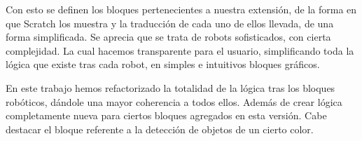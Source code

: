 Con esto se definen los bloques pertenecientes a nuestra extensión, de la forma en que Scratch los muestra y la traducción de cada uno de ellos llevada, de una forma simplificada. Se aprecia que se trata de robots sofisticados, con cierta complejidad. La cual hacemos transparente para el usuario, simplificando toda la lógica que existe tras cada robot, en simples e intuitivos bloques gráficos.

En este trabajo hemos refactorizado la totalidad de la lógica tras los bloques robóticos, dándole una mayor coherencia a todos ellos. Además de crear lógica completamente nueva para ciertos bloques agregados en esta versión. Cabe destacar el bloque referente a la detección de objetos de un cierto color.\\






